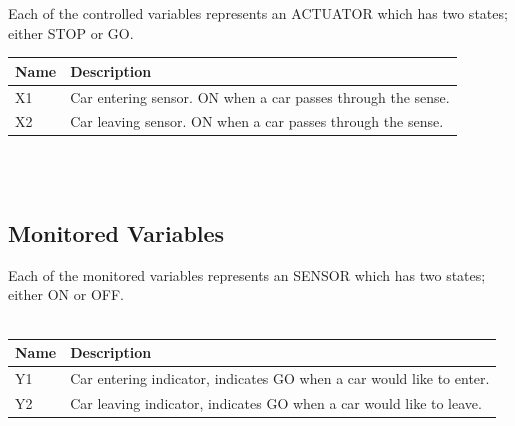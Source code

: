 \documentclass[fontsize=12pt,paper=letter,twoside]{scrartcl}
\begin{document}
{Each of the controlled variables represents an ACTUATOR which has two states; either STOP or GO.\\} 

\begin{tabular}{ | p{2cm} | p{12cm}  |}
\hline
Name & Description  \\
\hline
X1 & Car entering sensor. ON when a car passes through the sense.    \\
\hline
X2 & Car leaving sensor. ON when a car passes through the sense.    \\
\hline
\end{tabular}
\\
\\

\subsection{Monitored Variables}
{Each of the monitored variables represents an SENSOR which has two states; either ON or OFF.\\}\\

\begin{tabular}{ | p{2cm} | p{12cm}  |}
\hline
Name & Description  \\
\hline
Y1 & Car entering indicator, indicates GO when a car would like to enter.    \\
\hline
Y2 & Car leaving indicator, indicates GO when a car would like to leave.    \\
\hline
\end{tabular}

\newpage
\end{document}
